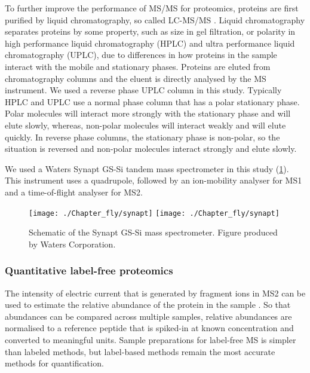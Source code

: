 To further improve the performance of MS/MS for proteomics, proteins are first purified by liquid chromatography, so called LC-MS/MS \cite{Henderson1992}.
Liquid chromatography separates proteins by some property, such as size in gel filtration, or polarity in high performance liquid chromatography (HPLC) and ultra performance liquid chromatography (UPLC), due to differences in how proteins in the sample interact with the mobile and stationary phases.
Proteins are eluted from chromatography columns and the eluent is directly analysed by the MS instrument.
We used a reverse phase UPLC column in this study.
Typically HPLC and UPLC use a normal phase column that has a polar stationary phase.
Polar molecules will interact more strongly with the stationary phase and will elute slowly, whereas, non-polar molecules will interact weakly and will elute quickly.
In reverse phase columns, the stationary phase is non-polar, so the situation is reversed and non-polar molecules interact strongly and elute slowly.

We used a Waters Synapt GS-Si tandem mass spectrometer in this study (\ref{fig:synapt}).
This instrument uses a quadrupole, followed by an ion-mobility analyser for MS1 and a time-of-flight analyser for MS2.

\begin{figure}[!hbt]
    \centering
    \ifredact
        \texttt{[image: ./Chapter\_fly/synapt]}
    \else
        \texttt{[image: ./Chapter\_fly/synapt]}
    \fi
    \caption{%
        Schematic of the Synapt GS-Si mass spectrometer.
        Figure produced by Waters Corporation.
    }
    \label{fig:synapt}
\end{figure}

\subsubsection{Quantitative label-free proteomics}

The intensity of electric current that is generated by fragment ions in MS2 can be used to estimate the relative abundance of the protein in the sample \cite{Schubert2017}.
So that abundances can be compared across multiple samples, relative abundances are normalised to a reference peptide that is spiked-in at known concentration and converted to meaningful units.
Sample preparations for label-free MS is simpler than labeled methods, but label-based methods remain the most accurate methods for quantification.

